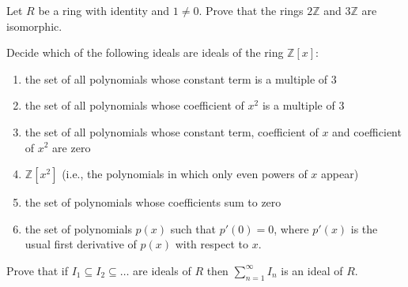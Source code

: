 \documentclass[12pt,letterpaper]{hmcpset}
\newcommand{\Zz}{\mathbb{Z}}
\begin{document}

\begin{problem}[7.3.1]
	Let $R$ be a ring with identity and $1 \ne 0$. Prove that the rings $2\Zz$ and $3\Zz$ are isomorphic.
\end{problem}

\begin{solution}
\vfill
\end{solution}
\newpage

\begin{problem}[7.3.10]
	Decide which of the following ideals are ideals of the ring $\Zz[x]$:
	\begin{enumerate}
	    \item
	        the set of all polynomials
	        whose constant term is a
	        multiple of $3$
	    \item
	        the set of all polynomials
	        whose coefficient of
	        $x^2$ is a multiple of $3$
	    \item
	        the set of all polynomials
	        whose constant term, coefficient
	        of $x$ and coefficient of $x^2$
	        are zero
	    \item
	        $\Zz[x^2]$ (i.e., the polynomials
	        in which only even powers of $x$
	        appear)
	    \item
	        the set of polynomials whose
	        coefficients sum to zero
	    \item
	        the set of polynomials $p(x)$
	        such that $p'(0) = 0$, where
	        $p'(x)$ is the usual
	        first derivative of $p(x)$
	        with respect to $x$.
	\end{enumerate}
\end{problem}

\begin{solution}
\vfill
\end{solution}
\newpage

\begin{problem}[7.3.19]
	Prove that if $I_1 \subseteq I_2 \subseteq \dots $ are ideals of $R$ then $\sum_{n=1}^\infty I_n$ is an ideal of $R$.
\end{problem}

\begin{solution}
\vfill
\end{solution}
\newpage
\end{document}
